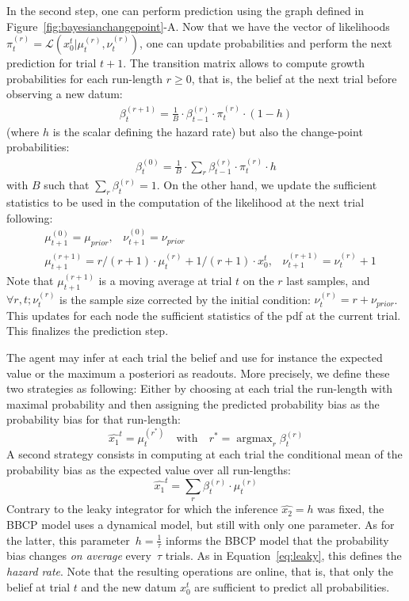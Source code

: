 \documentclass[12pt,english]{article}%
\newcommand{\eql}[1]{\begin{equation}#1\end{equation}}
\newcommand{\eqa}[1]{\begin{align}#1\end{align}}
\DeclareMathOperator{\argmax}{argmax}
\newcommand{\Ll}{\mathcal{L}}
\newcommand{\seeFig}[1]{Figure~\ref{fig:#1}}
\newcommand{\seeEq}[1]{Equation~\ref{eq:#1}}
\begin{document}
In the second step, one can perform prediction
using the graph defined in \seeFig{bayesianchangepoint}-A.
Now that we have the vector of likelihoods $\pi^{(r)}_t=\Ll(x_0^t |  \mu^{(r)}_{t}, \nu^{(r)}_{t})$,
one can update probabilities and perform the next prediction for trial $t+1$.
The transition matrix %
allows to compute growth probabilities for each run-length $r \geq 0$, 
that is, the belief at the next trial before observing a new datum:
\eqa{
\beta^{(r+1)}_t = \frac{1}{B} \cdot \beta^{(r)}_{t-1} \cdot \pi^{(r)}_{t} \cdot (1-h)
}
(where $h$ is the scalar defining the hazard rate)
but also the change-point probabilities:
\eqa{
\beta^{(0)}_t  = \frac{1}{B} \cdot \sum_{r} \beta^{(r)}_{t-1} \cdot \pi^{(r)}_{t} \cdot h
}
with $B$ such that $\sum_{r} \beta^{(r)}_{t} = 1$.
On the other hand, we update the sufficient statistics to be used 
in the computation of the likelihood at the next trial following:
\eqa{
& \mu^{(0)}_{t+1} = \mu_{prior} \text{,} \quad \nu^{(0)}_{t+1} = \nu_{prior} \\
& \mu^{(r+1)}_{t+1} = r/(r+1) \cdot \mu^{(r)}_{t} + 1/(r+1) \cdot x_0^t \text{,} \quad \nu^{(r+1)}_{t+1} = \nu^{(r)}_{t} + 1
}
Note that $\mu^{(r+1)}_{t+1}$ is a moving average at trial $t$ on the $r$ last samples,
and $\forall r, t; \nu^{(r)}_{t}$ is the sample size corrected by the initial condition:
$\nu^{(r)}_{t} = r + \nu_{prior}$.
This updates for each node the sufficient statistics of the pdf at the current trial.
This finalizes the prediction step.

The agent may infer at each trial the belief
and use for instance the expected value or the maximum a posteriori as readouts.
More precisely, we define these two strategies as following:
Either by choosing
at each trial the run-length with maximal probability
and then assigning the predicted probability bias
as the probability bias for that run-length:
\eql{
\hat{x_1}^t = \mu^{(r^\ast)}_{t} \quad \text{with} \quad r^\ast = \argmax_r \beta^{(r)}_{t}
}
A second strategy consists in computing
at each trial the conditional mean of the probability bias
as the expected value over all run-lengths:
\eql{
\hat{x_1}^t = \sum_{r} \beta^{(r)}_{t} \cdot \mu^{(r)}_{t}
}
Contrary to the leaky integrator for which the inference $\hat{x_2}=h$ was fixed,
the BBCP model uses a dynamical model, but still with only one parameter.
As for the latter, this parameter~$h=\frac 1 \tau$ informs the BBCP model
that the probability bias  changes \emph{on average} every~$\tau$ trials.
As in \seeEq{leaky}, this defines the \emph{hazard rate}.
Note that the resulting operations are online, that is,
that only the belief at trial $t$ and the new datum $x_0^t$
are sufficient to predict all probabilities.
\end{document}
